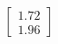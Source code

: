 \documentclass[preview]{standalone}
\begin{document}
\begin{align*}
\begin{bmatrix} 1.72 \\ 1.96 \end{bmatrix}
\end{align*}
\end{document}
